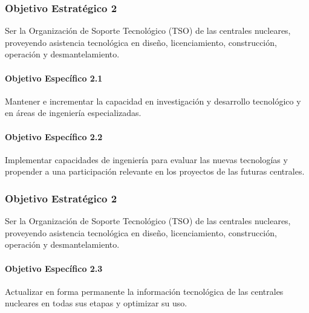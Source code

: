 \subsubsection{Objetivo Estratégico 2}

Ser la Organización de Soporte Tecnológico (TSO)
de las centrales nucleares, proveyendo asistencia tecnológica en diseño,
licenciamiento, construcción, operación y desmantelamiento.

\paragraph{Objetivo Específico 2.1}
Mantener e incrementar la capacidad en investigación y
desarrollo tecnológico y en áreas de ingeniería especializadas.

\paragraph{Objetivo Específico 2.2}

Implementar capacidades de ingeniería para evaluar las nuevas
tecnologías y propender a una participación relevante en los proyectos de las futuras
centrales.

\subsubsection{Objetivo Estratégico 2}

Ser la Organización de Soporte Tecnológico (TSO)
de las centrales nucleares, proveyendo asistencia tecnológica en diseño,
licenciamiento, construcción, operación y desmantelamiento.

\paragraph{Objetivo Específico 2.3}

Actualizar en forma permanente la información tecnológica de
las centrales nucleares en todas sus etapas y optimizar su uso.


